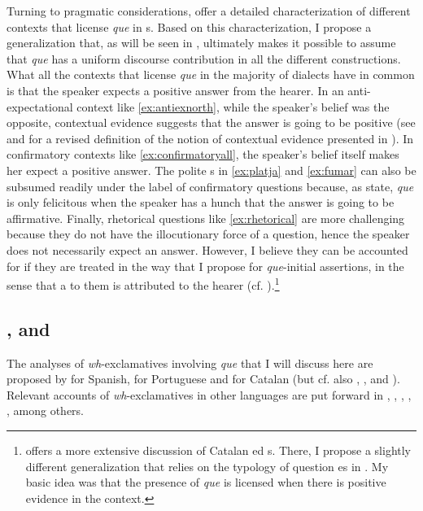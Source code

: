Turning to pragmatic considerations, \citet{PrietoRigau2007} offer a detailed characterization of different  contexts that license \emph{que} in s. Based on this characterization, I propose a generalization that, as will be seen in ,   ultimately makes it possible to assume that \emph{que} has  a uniform discourse contribution in all the different constructions. What all the contexts that license \emph{que} in the majority of dialects have in common is that the speaker expects a positive answer from the hearer. In an anti-expectational context like \eqref{ex:antiexnorth}, while the speaker's belief was the opposite, contextual evidence  suggests that the answer is going to be positive (see \citealt{Kocher2017a} and  for a revised definition of the notion of contextual evidence presented in \citealt{Buering2000}). In confirmatory contexts like \eqref{ex:confirmatoryall}, the speaker's belief itself makes her expect a positive answer. The polite s in \eqref{ex:platja} and \eqref{ex:fumar} can also be subsumed readily under the label of confirmatory questions because, as \citet{PrietoRigau2007} state, \emph{que} is only felicitous when the speaker has a hunch that the answer is going to be affirmative. Finally, rhetorical questions like \eqref{ex:rhetorical} are more challenging because they  do not   have the illocutionary force of a question, hence the speaker does not necessarily expect an answer. However, I believe they can be accounted for if they are treated in  the way that I propose for \emph{que}-initial assertions, in the sense that a  to them is attributed to the hearer (cf. ).\footnote{\citet{Kocher2017a} offers  a more extensive discussion of Catalan ed s. There, I  propose a slightly different generalization that relies on the typology of question es in \citet{Sudo2013}. My basic idea was that the presence of \emph{que} is licensed when there is positive evidence in the context.}



\subsection{\citet{Ambar2003}, \citet{Castroviejo2006} and \citet{DemonteSoriano2009}}

 The  analyses of \textit{wh}-exclamatives involving \emph{que} that I will discuss here are  proposed by \citet{DemonteSoriano2009} for Spanish, \citet{Ambar2003} for Portuguese and \citet{Castroviejo2006} for Catalan (but cf. also \citealt{Bosque1984}, \citealt{Brucart1993},  \citealt{Villalba2008} and \citealt{Gutierrez-Rexach2001}). 
   Relevant accounts of \textit{wh}-exclamatives in other languages are put forward in  
\citet{Milner1978}, \citet{Radford1982}, \citet{Beninca1996}, \citet{Zanuttini2003},  \citet{Cruschina2015}, among others.\largerpage

